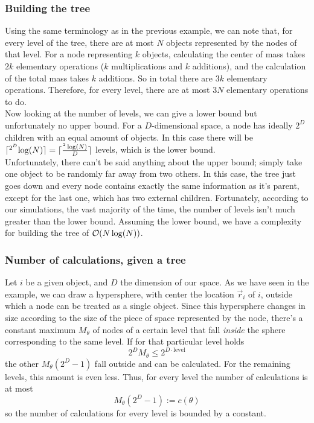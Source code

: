 \subsubsection*{Building the tree} Using the same terminology as in the previous example, we can note that, for every level of the tree, there are at most $N$ objects represented by the nodes of that level. For a node representing $k$ objects, calculating the center of mass takes $2k$ elementary operations ($k$ multiplications and $k$ additions), and the calculation of the total mass takes $k$ additions. So in total there are $3k$ elementary operations. Therefore, for every level, there are at most $3N$ elementary operations to do.\\
Now looking at the number of levels, we can give a lower bound but unfortunately no upper bound. For a $D$-dimensional space, a node has ideally $2^D$ children with an equal amount of objects. In this case there will be $\lceil ^{2^D} \log(N) \rceil = \lceil \frac{^2\log(N)}{D} \rceil$ levels, which is the lower bound.\\
Unfortunately, there can't be said anything about the upper bound; simply take one object to be randomly far away from two others. In this case, the tree just goes down and every node contains exactly the same information as it's parent, except for the last one, which has two external children. Fortunately, according to our simulations, the vast majority of the time, the number of levels isn't much greater than the lower bound. Assuming the lower bound, we have a complexity for building the tree of $\mathcal{O}(N\log(N))$.
\subsubsection*{Number of calculations, given a tree} Let $i$ be a given object, and $D$ the dimension of our space. As we have seen in the example, we can draw a hypersphere, with center the location $\vec{r}_i$ of $i$, outside which a node can be treated as a single object. Since this hypersphere changes in size according to the size of the piece of space represented by the node, there's a constant maximum $M_\theta$ of nodes of a certain level that fall \textit{inside} the sphere corresponding to the same level. If for that particular level holds
\[
2^D M_\theta \leq 2^{D\cdot \text{level}}
\]
the other $M_\theta(2^D-1)$ fall outside and can be calculated. For the remaining levels, this amount is even less. Thus, for every level the number of calculations is at most
\[
M_\theta (2^D-1) := c(\theta)
\]
so the number of calculations for every level is bounded by a constant.\\

